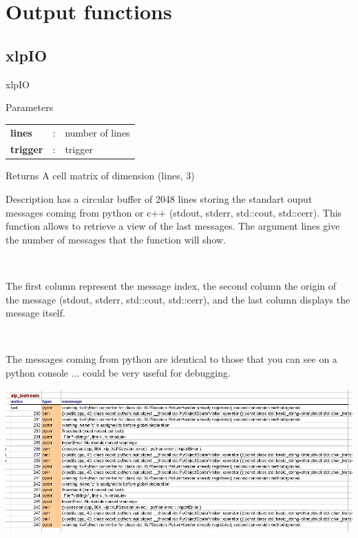 \section{Output functions}


\subsection{xlpIO}

\begin{xlpfunctitle}{xlpIO}

\begin{xlpfunc}{Parameters}
\begin{tabular}{p{3.5cm}cl}
\textbf{lines}& : & number of lines \\
\textbf{trigger}& : & trigger 
\end{tabular}
\end{xlpfunc}


\begin{xlpfunc}{Returns}
A cell matrix of dimension (lines, 3)
\end{xlpfunc}

\begin{xlpfunc}{Description}
\xlp has a circular buffer of 2048 lines storing the standart ouput messages coming from python or c++ (stdout, stderr, std::cout, std::cerr). This function allows to retrieve a view of the last messages. The argument lines give the number of messages that the function will show.


\

The first column represent the message index, the second column the origin of the message (stdout, stderr, std::cout, std::cerr), and the last column displays the message itself. 

\

The messages coming from python are identical to those that you can see on a python console ... could be very useful for debugging.

\includegraphics[width=14cm]{images/io.jpg}
\end{xlpfunc}
\end{xlpfunctitle}

